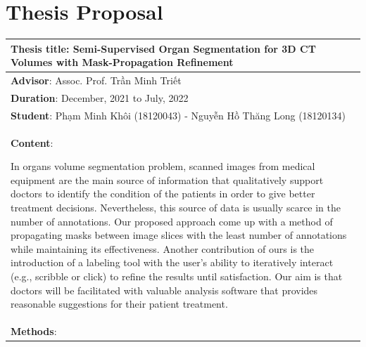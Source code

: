 \chapter{Thesis Proposal}
\begin{longtable}{|p{{{80mm}}}|c|}
\hline
\multicolumn{2}{|m{\linewidth}|}{\textbf{Thesis title}: Semi-Supervised Organ Segmentation for 3D CT Volumes with Mask-Propagation Refinement}\\
\hline
\multicolumn{2}{|m{\linewidth}|}{\textbf{Advisor}: Assoc. Prof. Trần Minh Triết} \\
\hline
\multicolumn{2}{|m{\linewidth}|}{\textbf{Duration}: December, 2021 to July, 2022}\\
\hline
\multicolumn{2}{|m{\linewidth}|}{\textbf{Student}: Phạm Minh Khôi (18120043) - Nguyễn Hồ Thăng Long (18120134)}\\
\hline

\hline
\multicolumn{2}{|m{\linewidth}|}{\textbf{Content}:\par

In organs volume segmentation problem, scanned images from medical equipment are the main source of information that qualitatively support doctors to identify the condition of the patients in order to give better treatment decisions. Nevertheless, this source of data is usually scarce in the number of annotations. Our proposed approach come up with a method of propagating masks between image slices with the least number of annotations while maintaining its effectiveness. Another contribution of ours is the introduction of a labeling tool with the user’s ability to iteratively interact (e.g., scribble or click) to refine the results until satisfaction. Our aim is that doctors will be facilitated with valuable analysis software that provides reasonable suggestions for their patient treatment.
}\\
\hline
\multicolumn{2}{|m{\linewidth}|}{\textbf{Methods}:\par

}
\end{longtable}
